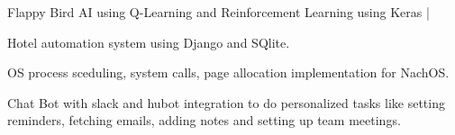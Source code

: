 \documentclass[]{deedy-resume-openfont}
\begin{document}
\begin{minipage}[t]{0.69\textwidth}

\begin{tightemize}
\item Flappy Bird AI using Q-Learning and Reinforcement Learning using Keras | 
\item Hotel automation system using Django and SQlite.
\item OS process sceduling, system calls, page allocation implementation for NachOS.
\item Chat Bot with slack and hubot integration to do personalized tasks like setting reminders, fetching emails, adding notes and setting up team meetings.
\end{tightemize}



\end{minipage} 
\end{document}
